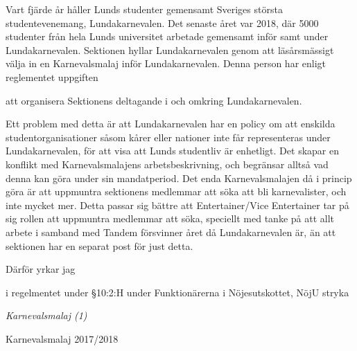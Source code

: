 \documentclass[../_main/handlingar.tex]{subfiles}
\begin{document}

Vart fjärde år håller Lunds studenter gemensamt Sveriges största studentevenemang, Lundakarnevalen. 
Det senaste året var 2018, där 5000 studenter från hela Lunds universitet arbetade gemensamt inför samt under Lundakarnevalen. 
Sektionen hyllar Lundakarnevalen genom att läsårsmässigt välja in en Karnevalsmalaj inför Lundakarnevalen. 
Denna person har enligt reglementet uppgiften 
\begin{dashlist}
    \item att organisera Sektionens deltagande i och omkring Lundakarnevalen.
\end{dashlist}

Ett problem med detta är att Lundakarnevalen har en policy om att enskilda studentorganisationer såsom kårer eller nationer inte får representeras under Lundakarnevalen, för att visa att Lunds studentliv är enhetligt.
Det skapar en konflikt med Karnevalsmalajens arbetsbeskrivning, och begränsar alltså vad denna kan göra under sin mandatperiod. Det enda Karnevalsmalajen då i princip göra är att uppmuntra sektionens medlemmar att söka att bli karnevalister, och inte mycket mer.
Detta passar sig bättre att Entertainer/Vice Entertainer tar på sig rollen att uppmuntra medlemmar att söka, speciellt med tanke på att allt arbete i samband med Tandem försvinner året då Lundakarnevalen är, än att sektionen har en separat post för just detta.


Därför yrkar jag 
\begin{attsatser}

    \att i regelmentet under \S10:2:H under Funktionärerna i Nöjesutskottet, NöjU stryka 
    \par \textit{Karnevalsmalaj (1)}

\end{attsatser}


\begin{signatures}{1}
    \isekt
    \signature{Filip Larsson}{Karnevalsmalaj 2017/2018}
\end{signatures}
\end{document}
